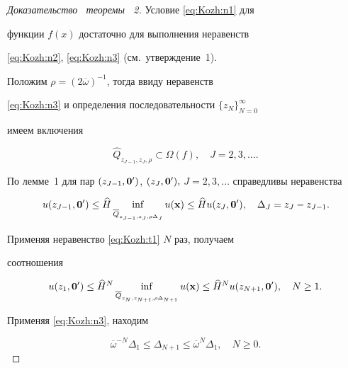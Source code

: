 \begin{proof}[Доказательство \, теоремы \, \rm 2] Условие \eqref{eq:Kozh:n1} для

функции $f(x)$ достаточно для выполнения неравенств

\eqref{eq:Kozh:n2}, \eqref{eq:Kozh:n3} (см.~утверждение~1).

Положим $\rho={(2\overline{\omega})}^{-1}$, тогда  ввиду  неравенств

\eqref{eq:Kozh:n3} и определения последовательности $\{z_N\}_{N=0}^{\infty}$

имеем включения

$$

\widehat{Q}_{z_{J-1},z_J,\rho}\subset \Omega ({f}), \quad J= 2, 3,

\ldots.

$$

По лемме~1 для пар $(z_{J-1},{\bf 0}')$, $(z_{J},{\bf 0}'),$ $J=

2, 3, \ldots$ справедливы неравенства

\begin{equation}

u(z_{J-1},{\bf 0}')\leq

\widehat{H}\inf\limits_{\overline{Q}_{z_{J-1},z_{J},\rho\Delta_J}}u({\bf

x})\leq\widehat{H} u(z_{J},{\bf 0}'), \quad \Delta_J=z_J-z_{J-1}.\label{eq:Kozh:t1}

\end{equation}



Применяя  неравенство \eqref{eq:Kozh:t1} $N$ раз, получаем

соотношения

\begin{equation}

u(z_1, {\bf 0}')\leq\widehat{H}^{N}

\inf\limits_{\overline{Q}_{z_{N},z_{N+1},\rho\Delta_{N+1}}}u({\bf

x })\leq\widehat{H}^{N}u(z_{N+1},{\bf 0}'),\quad N\geq 1.\label{eq:Kozh:t2}

\end{equation}



Применяя \eqref{eq:Kozh:n3}, находим

\begin{equation}

\overline{\omega}^{-N}\Delta_1 \leq \Delta_{N+1}\leq

\overline{\omega}^{N}\Delta_1,\quad N\geq 0.\label{eq:Kozh:t3}


\end{equation}
\end{proof}
